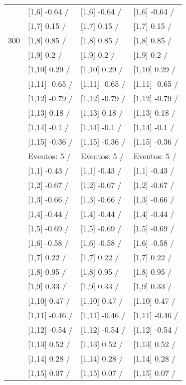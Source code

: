 \begin{table}
\begin{tabular}[t]{llll}
 & {}[1,6] -0.64  / & {}[1,6] -0.64  / & {}[1,6] -0.64  /\\
 & {}[1,7] 0.15  / & {}[1,7] 0.15  / & {}[1,7] 0.15  /\\
300 & {}[1,8] 0.85  / & {}[1,8] 0.85  / & {}[1,8] 0.85  /\\
\addlinespace
 & {}[1,9] 0.2  / & {}[1,9] 0.2  / & {}[1,9] 0.2  /\\
 & {}[1,10] 0.29  / & {}[1,10] 0.29  / & {}[1,10] 0.29  /\\
 & {}[1,11] -0.65  / & {}[1,11] -0.65  / & {}[1,11] -0.65  /\\
 & {}[1,12] -0.79  / & {}[1,12] -0.79  / & {}[1,12] -0.79  /\\
 & {}[1,13] 0.18  / & {}[1,13] 0.18  / & {}[1,13] 0.18  /\\
\addlinespace
 & {}[1,14] -0.1  / & {}[1,14] -0.1  / & {}[1,14] -0.1  /\\
 & {}[1,15] -0.36  / & {}[1,15] -0.36  / & {}[1,15] -0.36  /\\
 & Eventos:  5 / & Eventos:  5 / & Eventos:  5 /\\
 & {}[1,1] -0.43  / & {}[1,1] -0.43  / & {}[1,1] -0.43  /\\
 & {}[1,2] -0.67  / & {}[1,2] -0.67  / & {}[1,2] -0.67  /\\
\addlinespace
 & {}[1,3] -0.66  / & {}[1,3] -0.66  / & {}[1,3] -0.66  /\\
 & {}[1,4] -0.44  / & {}[1,4] -0.44  / & {}[1,4] -0.44  /\\
 & {}[1,5] -0.69  / & {}[1,5] -0.69  / & {}[1,5] -0.69  /\\
 & {}[1,6] -0.58  / & {}[1,6] -0.58  / & {}[1,6] -0.58  /\\
 & {}[1,7] 0.22  / & {}[1,7] 0.22  / & {}[1,7] 0.22  /\\
\addlinespace
500 & {}[1,8] 0.95  / & {}[1,8] 0.95  / & {}[1,8] 0.95  /\\
 & {}[1,9] 0.33  / & {}[1,9] 0.33  / & {}[1,9] 0.33  /\\
 & {}[1,10] 0.47  / & {}[1,10] 0.47  / & {}[1,10] 0.47  /\\
 & {}[1,11] -0.46  / & {}[1,11] -0.46  / & {}[1,11] -0.46  /\\
 & {}[1,12] -0.54  / & {}[1,12] -0.54  / & {}[1,12] -0.54  /\\
\addlinespace
 & {}[1,13] 0.52  / & {}[1,13] 0.52  / & {}[1,13] 0.52  /\\
 & {}[1,14] 0.28  / & {}[1,14] 0.28  / & {}[1,14] 0.28  /\\
 & {}[1,15] 0.07  / & {}[1,15] 0.07  / & {}[1,15] 0.07  /\\
\bottomrule
\end{tabular}
\end{table}
